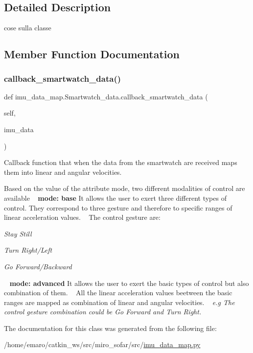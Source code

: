 \subsection{Detailed Description}
cose sulla classe 

\subsection{Member Function Documentation}
\mbox{\label{classimu__data__map_1_1Smartwatch__data_ae90cc1ac064c75ea42f00bc34b168708}} 
\subsubsection{\texorpdfstring{callback\+\_\+smartwatch\+\_\+data()}{callback\_smartwatch\_data()}}
{\footnotesize\ttfamily def imu\+\_\+data\+\_\+map.\+Smartwatch\+\_\+data.\+callback\+\_\+smartwatch\+\_\+data (\begin{DoxyParamCaption}\item[{}]{self,  }\item[{}]{imu\+\_\+data }\end{DoxyParamCaption})}



Callback function that when the data from the smartwatch are received maps them into linear and angular velocities. 

Based on the value of the attribute mode, two different modalities of control are available ~\newline
 {\bfseries{mode\+: base}}  It allows the user to exert three different types of control. They correspond to three gesture and therefore to specific ranges of linear acceleration values. ~\newline
 The control gesture are\+: 
\begin{DoxyItemize}
\item {\itshape Stay Still} 
\item {\itshape Turn Right/\+Left} 
\item {\itshape Go Forward/\+Backward}
\end{DoxyItemize} ~\newline
 {\bfseries{mode\+: advanced}}  It allows the user to exert the basic types of control but also combination of them. ~\newline
 All the linear acceleration values beetween the basic ranges are mapped as combination of linear and angular velocities. ~\newline
{\itshape  e.\+g The control gesture combination could be Go Forward and Turn Right.}  

The documentation for this class was generated from the following file\+:\begin{DoxyCompactItemize}
\item 
/home/emaro/catkin\+\_\+ws/src/miro\+\_\+sofar/src/\mbox{\hyperlink{imu__data__map_8py}{imu\+\_\+data\+\_\+map.\+py}}\end{DoxyCompactItemize}
